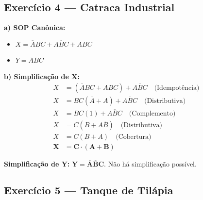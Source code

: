 \documentclass[12pt]{article}
\begin{document}
\subsection*{Exercício 4 — Catraca Industrial}

\begin{solucao}
\textbf{a) SOP Canônica:}
\begin{itemize}
    \item $X = \overline{A}BC + A\overline{B}C + ABC$
    \item $Y = \overline{A}\overline{B}C$
\end{itemize}

\textbf{b) Simplificação de X:}
\begin{align*}
    X &= (\overline{A}BC + ABC) + A\overline{B}C \quad \text{(Idempotência)} \\
    X &= BC(\overline{A} + A) + A\overline{B}C \quad \text{(Distributiva)} \\
    X &= BC(1) + A\overline{B}C \quad \text{(Complemento)} \\
    X &= C(B + A\overline{B}) \quad \text{(Distributiva)} \\
    X &= C(B + A) \quad \text{(Cobertura)} \\
    \mathbf{X} &= \mathbf{C \cdot (A + B)}
\end{align*}

\textbf{Simplificação de Y:}
$\mathbf{Y = \overline{A}\overline{B}C}$. Não há simplificação possível.
\end{solucao}

\subsection*{Exercício 5 — Tanque de Tilápia}
\end{document}
